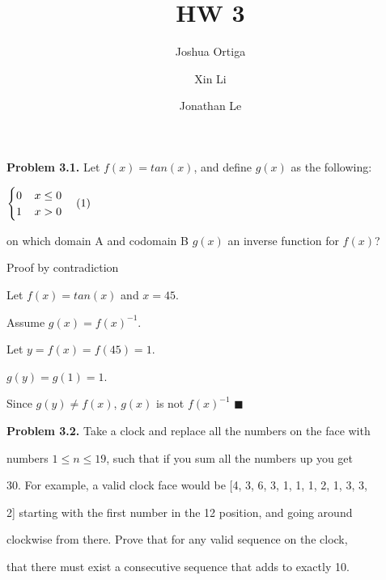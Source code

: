 \documentclass{article}
\title{HW 3}
\author{Joshua Ortiga \\
		\and
		Xin Li \\
		\and
		Jonathan Le}
\begin{document}
\maketitle
\textbf{Problem 3.1.} Let $f(x)=tan(x)$, and define $g(x)$ as the following: 

\begin{center}
$
	\hfill
	\begin{cases}
	 0 \;\;\;\; x \leq 0 \\ 
	 1 \;\;\;\; x > 0
	\end{cases}
	\hfill (1)
$
\end{center}

on which domain A and codomain B $g(x)$ an inverse function for $f(x)$?

\vspace{0.5cm}

Proof by contradiction

\vspace{0.25cm}

Let $f(x) = tan(x)$ and $x = 45$.

\vspace{0.25cm}

Assume $g(x) = f(x)^{-1}$.

\vspace{0.25cm}

Let $y = f(x) = f(45) = 1$.

\vspace{0.25cm}

$g(y) = g(1) = 1$.

\vspace{0.25cm}

Since $g(y) \neq f(x)$, $g(x)$ is not $f(x)^{-1}$ $\blacksquare$

\vspace{0.5cm}

\textbf{Problem 3.2.} Take a clock and replace all the numbers on the face with 

numbers $1 \leq n \leq 19$, such that if you sum all the numbers up you get

30. For example, a valid clock face would be [4, 3, 6, 3, 1, 1, 1, 2, 1, 3, 3, 

2] starting with the first number in the 12 position, and going around 

clockwise from there. Prove that for any valid sequence on the clock, 

that there must exist a consecutive sequence that adds to exactly 10.

\vspace{0.25cm}
\end{document}

